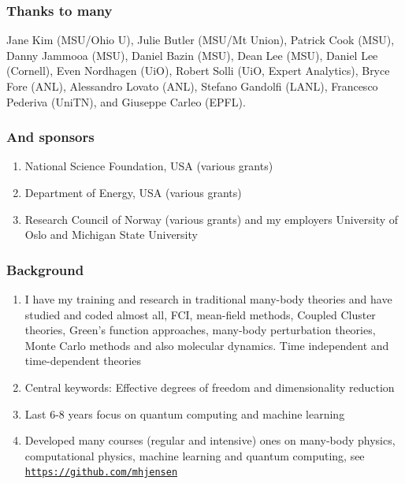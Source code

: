 \documentclass{beamer}
\begin{document}
\begin{frame}
\frametitle{Thanks to many}

Jane Kim (MSU/Ohio U), Julie Butler (MSU/Mt Union), Patrick Cook (MSU), Danny Jammooa (MSU), Daniel Bazin (MSU), Dean Lee (MSU), Daniel Lee (Cornell), Even Nordhagen (UiO), Robert Solli (UiO, Expert Analytics), Bryce Fore (ANL), Alessandro Lovato (ANL), Stefano Gandolfi (LANL), Francesco Pederiva (UniTN), and Giuseppe Carleo (EPFL).
\end{frame}

\begin{frame}
\frametitle{And sponsors}

\begin{enumerate}
\item National Science Foundation, USA (various grants)

\item Department of Energy, USA (various grants)

\item Research Council of Norway (various grants) and my employers University of Oslo and Michigan State University
\end{enumerate}

\noindent
\end{frame}

\begin{frame}
\frametitle{Background}

\begin{block}{}
\begin{enumerate}
\item I have my training and research in traditional many-body theories and have studied and coded almost all, FCI, mean-field methods, Coupled Cluster theories, Green's function approaches, many-body perturbation theories, Monte Carlo methods and also molecular dynamics. Time independent and time-dependent theories

\item Central keywords: Effective degrees of freedom and dimensionality reduction

\item Last 6-8 years  focus on quantum computing and machine learning

\item Developed many courses (regular and intensive) ones on many-body physics, computational physics, machine learning and quantum computing, see \href{{https://github.com/mhjensen}}{\nolinkurl{https://github.com/mhjensen}}
\end{enumerate}

\noindent
\end{block}
\end{frame}
\end{document}
